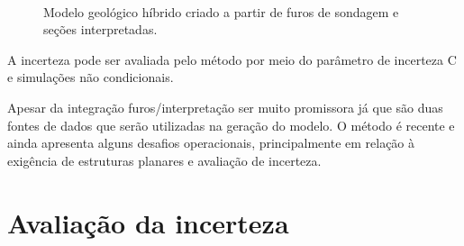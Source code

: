 \begin{figure}[H]
\caption{Modelo geológico híbrido criado a partir de furos de sondagem e seções interpretadas.}\label{mls_model}
\begin{center}
\\
\end{center}
\begin{center}
\end{center}
\end{figure}

A incerteza pode ser avaliada pelo método por meio do parâmetro de incerteza C e simulações não condicionais. 

Apesar da integração furos/interpretação ser muito promissora já que são duas fontes de dados que serão utilizadas na geração do modelo. O método é recente e ainda apresenta alguns desafios operacionais, principalmente em relação à exigência de estruturas planares e avaliação de incerteza.

\section{Avaliação da incerteza}

